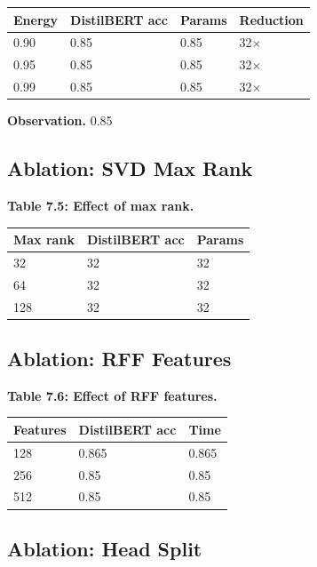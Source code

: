 \begin{table}[H]
\centering
\small
\begin{tabular}{llll}
\toprule
\textbf{Energy} & \textbf{DistilBERT acc} & \textbf{Params} & \textbf{Reduction} \\
\midrule
0.90 & 0.85 & 0.85 & 32$\times$ \\
0.95 & 0.85 & 0.85 & 32$\times$ \\
0.99 & 0.85 & 0.85 & 32$\times$ \\
\bottomrule
\end{tabular}
\end{table}

\textbf{Observation.} 0.85

\subsection{Ablation: SVD Max Rank}

\textbf{Table 7.5: Effect of max rank.}

\begin{table}[H]
\centering
\small
\begin{tabular}{lll}
\toprule
\textbf{Max rank} & \textbf{DistilBERT acc} & \textbf{Params} \\
\midrule
32 & 32 & 32 \\
64 & 32 & 32 \\
128 & 32 & 32 \\
\bottomrule
\end{tabular}
\end{table}

\subsection{Ablation: RFF Features}

\textbf{Table 7.6: Effect of RFF features.}

\begin{table}[H]
\centering
\small
\begin{tabular}{lll}
\toprule
\textbf{Features} & \textbf{DistilBERT acc} & \textbf{Time} \\
\midrule
128 & 0.865 & 0.865 \\
256 & 0.85 & 0.85 \\
512 & 0.85 & 0.85 \\
\bottomrule
\end{tabular}
\end{table}

\subsection{Ablation: Head Split}

